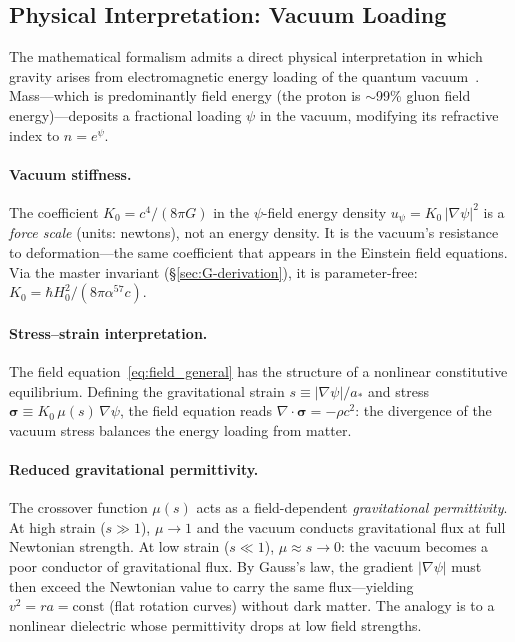 \subsection{Physical Interpretation: Vacuum Loading}\label{sec:vacuum-loading}

The mathematical formalism admits a direct physical interpretation in which
gravity arises from electromagnetic energy loading of the quantum
vacuum~\cite{AlcockVacuumLoading2026}. Mass---which is predominantly field
energy (the proton is $\sim$99\% gluon field energy)---deposits
a fractional loading $\psi$ in the vacuum, modifying its refractive index
to $n = e^\psi$.

\paragraph{Vacuum stiffness.}
The coefficient $K_0 = c^4/(8\pi G)$ in the $\psi$-field energy density
$u_\psi = K_0\,|\nabla\psi|^2$ is a \emph{force scale} (units: newtons),
not an energy density. It is the vacuum's resistance to deformation---the
same coefficient that appears in the Einstein field equations.
Via the master invariant (\S\ref{sec:G-derivation}), it is parameter-free:
$K_0 = \hbar H_0^2/(8\pi\alpha^{57}c)$.

\paragraph{Stress--strain interpretation.}
The field equation~\eqref{eq:field_general} has the structure of a nonlinear
constitutive equilibrium. Defining the gravitational strain
$s \equiv |\nabla\psi|/a_*$ and stress
$\bm{\sigma} \equiv K_0\,\mu(s)\,\nabla\psi$, the field equation reads
$\nabla\cdot\bm{\sigma} = -\rho c^2$: the divergence of the vacuum stress
balances the energy loading from matter.

\paragraph{Reduced gravitational permittivity.}
The crossover function $\mu(s)$ acts as a field-dependent
\emph{gravitational permittivity}. At high strain ($s \gg 1$), $\mu \to 1$
and the vacuum conducts gravitational flux at full Newtonian strength.
At low strain ($s \ll 1$), $\mu \approx s \to 0$: the vacuum becomes a poor
conductor of gravitational flux. By Gauss's law, the gradient
$|\nabla\psi|$ must then exceed the Newtonian value to carry the same
flux---yielding $v^2 = ra = \text{const}$ (flat rotation curves) without
dark matter. The analogy is to a nonlinear dielectric whose permittivity
drops at low field strengths.

